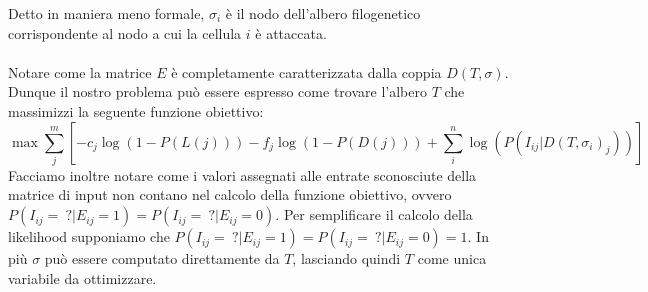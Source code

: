 \documentclass[12pt]{report}
\begin{document}
  Detto in maniera meno formale, ${\sigma}_{i}$ è il nodo dell'albero filogenetico corrispondente al nodo a cui la cellula $i$ è attaccata.\\\\
  Notare come la matrice $E$ è completamente caratterizzata dalla coppia $D(T, \sigma)$.
  Dunque il nostro problema può essere espresso come trovare l'albero $T$ che massimizzi la seguente funzione obiettivo:
  \[
    \max{\sum_{j}^{m}[-c_{j}\log(1-P(L(j)))-f_{j}\log(1-P(D(j)))+\sum_{i}^{n}\log(P(I_{ij}|D(T, \sigma_{i})_{j}))]}
  \]
  Facciamo inoltre notare come i valori assegnati alle entrate sconosciute della matrice di input non contano nel calcolo della funzione obiettivo, ovvero $P(I_{ij}=\ ?|E_{ij}=1)=P(I_{ij}=\ ?|E_{ij}=0)$. Per semplificare il calcolo della likelihood supponiamo che $P(I_{ij}=\ ?|E_{ij}=1)=P(I_{ij}=\ ?|E_{ij}=0)=1$.
  In più $\sigma$ può essere computato direttamente da $T$, lasciando quindi $T$ come unica variabile da ottimizzare.
\end{document}
